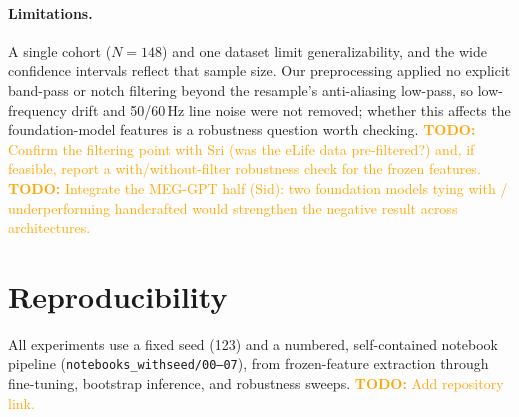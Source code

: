 \documentclass[11pt]{article}
\newcommand{\todo}[1]{\textcolor{orange}{\textbf{TODO:} #1}}
\begin{document}
\paragraph{Limitations.} A single cohort ($N=148$) and one dataset limit generalizability, and the
wide confidence intervals reflect that sample size. Our preprocessing applied no explicit band-pass
or notch filtering beyond the resample's anti-aliasing low-pass, so low-frequency drift and 50/60\,Hz
line noise were not removed; whether this affects the foundation-model features is a robustness
question worth checking. \todo{Confirm the filtering point with Sri (was the eLife data pre-filtered?)
and, if feasible, report a with/without-filter robustness check for the frozen features.}
\todo{Integrate the MEG-GPT half (Sid): two foundation models tying with / underperforming handcrafted
would strengthen the negative result across architectures.}

\section*{Reproducibility}
All experiments use a fixed seed (123) and a numbered, self-contained notebook pipeline
(\texttt{notebooks\_withseed/00--07}), from frozen-feature extraction through fine-tuning, bootstrap
inference, and robustness sweeps. \todo{Add repository link.}
\end{document}
